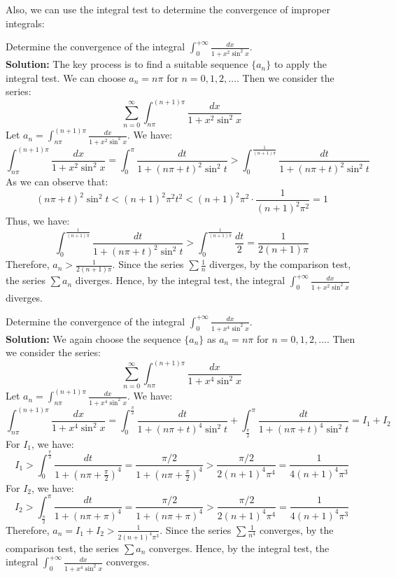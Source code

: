 Also, we can use the integral test to determine the convergence of improper integrals:

\newpage

\begin{example}
    Determine the convergence of the integral $\int_{0}^{+\infty} \frac{dx}{1 + x^2 \sin^2 x}$. \\
    \textbf{Solution:} The key process is to find a suitable sequence $\{a_n\}$ to apply the integral test. We can choose $a_n = n\pi$ for $n = 0, 1, 2, \ldots$. Then we consider the series:
    \[\sum_{n=0}^{\infty} \int_{n\pi}^{(n+1)\pi} \frac{dx}{1 + x^2 \sin^2 x}\]
    Let $a_n = \int_{n\pi}^{(n+1)\pi} \frac{dx}{1 + x^2 \sin^2 x}$. We have:
    \[
    \int_{n\pi}^{(n+1)\pi} \frac{dx}{1 + x^2 \sin^2 x} = \int_{0}^{\pi} \frac{dt}{1 + (n\pi + t)^2 \sin^2 t} > \int_{0}^{\frac{1}{(n+1)\pi}} \frac{dt}{1 + (n\pi + t)^2 \sin^2 t}
    \]
    As we can observe that:
    \[
    (n\pi + t)^2 \sin^2 t < (n+1)^2 \pi^2 t^2 < (n+1)^2 \pi^2 \cdot \frac{1}{(n+1)^2 \pi^2} = 1
    \]
    Thus, we have:
    \[\int_{0}^{\frac{1}{(n+1)\pi}} \frac{dt}{1 + (n\pi + t)^2 \sin^2 t} > \int_{0}^{\frac{1}{(n+1)\pi}} \frac{dt}{2} = \frac{1}{2(n+1)\pi}\]
    Therefore, $a_n > \frac{1}{2(n+1)\pi}$. Since the series $\sum \frac{1}{n}$ diverges, by the comparison test, the series $\sum a_n$ diverges. Hence, by the integral test, the integral $\int_{0}^{+\infty} \frac{dx}{1 + x^2 \sin^2 x}$ diverges.
\end{example}

\newpage

\begin{example}
    Determine the convergence of the integral $\int_{0}^{+\infty} \frac{dx}{1 + x^4 \sin^2 x}$. \\
    \textbf{Solution:} We again choose the sequence $\{a_n\}$ as $a_n = n\pi$ for $n = 0, 1, 2, \ldots$. Then we consider the series:
    \[\sum_{n=0}^{\infty} \int_{n\pi}^{(n+1)\pi} \frac{dx}{1 + x^4 \sin^2 x}\]
    Let $a_n = \int_{n\pi}^{(n+1)\pi} \frac{dx}{1 + x^4 \sin^2 x}$. We have:
    \[
    \int_{n\pi}^{(n+1)\pi} \frac{dx}{1 + x^4 \sin^2 x}
    = \int_{0}^{\frac{\pi}{2}} \frac{dt}{1 + (n\pi + t)^4 \sin^2 t} + \int_{\frac{\pi}{2}}^{\pi} \frac{dt}{1 + (n\pi + t)^4 \sin^2 t} = I_1 + I_2
    \]
    For $I_1$, we have:
    \[I_1 > \int_{0}^{\frac{\pi}{2}} \frac{dt}{1 + (n\pi + \frac{\pi}{2})^4} = \frac{\pi/2}{1 + (n\pi + \frac{\pi}{2})^4} > \frac{\pi/2}{2(n+1)^4 \pi^4} = \frac{1}{4(n+1)^4 \pi^3}\]
    For $I_2$, we have:
    \[I_2 > \int_{\frac{\pi}{2}}^{\pi} \frac{dt}{1 + (n\pi + \pi)^4} = \frac{\pi/2}{1 + (n\pi + \pi)^4} > \frac{\pi/2}{2(n+1)^4 \pi^4} = \frac{1}{4(n+1)^4 \pi^3}\]
    Therefore, $a_n = I_1 + I_2 > \frac{1}{2(n+1)^4 \pi^3}$. Since the series $\sum \frac{1}{n^4}$ converges, by the comparison test, the series $\sum a_n$ converges. Hence, by the integral test, the integral $\int_{0}^{+\infty} \frac{dx}{1 + x^4 \sin^2 x}$ converges.
\end{example}

